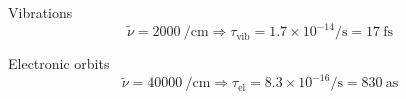 Vibrations
\begin{equation}
\tilde{\nu} = \SI{2000}{\per\centi\meter} \Rightarrow \tau_\mathrm{vib} = 1.7 \times 10^{-14} \si{\per\second}
= \SI{17}{\femto\second}
\end{equation}

Electronic orbits
\begin{equation}
\tilde{\nu} = \SI{40000}{\per\centi\meter} \Rightarrow \tau_\mathrm{el} = 8.3 \times 10^{-16} \si{\per\second}
= \SI{830}{\atto\second}
\end{equation}









